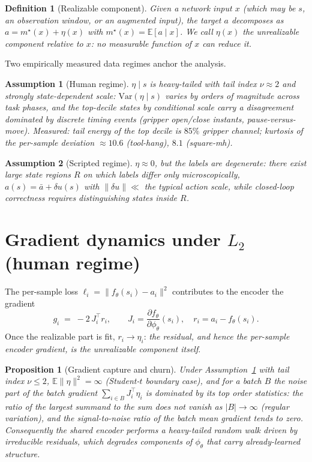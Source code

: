 \documentclass[11pt]{article}
\newtheorem{proposition}{Proposition}
\newtheorem{assumption}{Assumption}
\newtheorem{definition}{Definition}
\newcommand{\E}{\mathbb{E}}
\newcommand{\enc}{\phi_\theta}
\newcommand{\pol}{f_\theta}
\begin{document}
\begin{definition}[Realizable component]
Given a network input $x$ (which may be $s$, an observation window, or an
augmented input), the target $a$ decomposes as $a = m^\star(x) + \eta(x)$ with
$m^\star(x) = \E[a \mid x]$. We call $\eta(x)$ the \emph{unrealizable component}
relative to $x$: no measurable function of $x$ can reduce it.
\end{definition}

Two empirically measured data regimes anchor the analysis.

\begin{assumption}[Human regime]\label{as:human}
$\eta \mid s$ is heavy-tailed with tail index $\nu \approx 2$ and strongly
state-dependent scale: $\mathrm{Var}(\eta \mid s)$ varies by orders of magnitude
across task phases, and the top-decile states by conditional scale carry a
disagreement dominated by discrete timing events (gripper open/close instants,
pause-versus-move). Measured: tail energy of the top decile is $85\%$ gripper
channel; kurtosis of the per-sample deviation $\approx 10.6$ (tool-hang),
$8.1$ (square-mh).
\end{assumption}

\begin{assumption}[Scripted regime]\label{as:script}
$\eta \approx 0$, but the labels are \emph{degenerate}: there exist large state
regions $R$ on which labels differ only microscopically, $a(s) = \bar a + \delta
u(s)$ with $\|\delta u\| \ll$ the typical action scale, while closed-loop
correctness requires distinguishing states inside $R$.
\end{assumption}

\section{Gradient dynamics under $L_2$ (human regime)}

The per-sample loss $\ell_i = \|\pol(s_i) - a_i\|^2$ contributes to the encoder
the gradient
\begin{equation}
g_i \;=\; -2\, J_i^\top r_i, \qquad
J_i = \frac{\partial \pol}{\partial \enc}(s_i), \quad r_i = a_i - \pol(s_i).
\label{eq:persample}
\end{equation}
Once the realizable part is fit, $r_i \to \eta_i$: \emph{the residual, and hence
the per-sample encoder gradient, is the unrealizable component itself}.

\begin{proposition}[Gradient capture and churn]\label{prop:capture}
Under Assumption~\ref{as:human} with tail index $\nu \le 2$,
$\E\|\eta\|^2 = \infty$ (Student-$t$ boundary case), and for a batch
$B$ the noise part of the batch gradient $\sum_{i \in B} J_i^\top \eta_i$ is
dominated by its top order statistics: the ratio of the largest summand to the
sum does not vanish as $|B| \to \infty$ (regular variation), and the
signal-to-noise ratio of the batch mean gradient tends to zero. Consequently the
shared encoder performs a heavy-tailed random walk driven by irreducible
residuals, which degrades components of $\enc$ that carry already-learned
structure.
\end{proposition}
\end{document}
